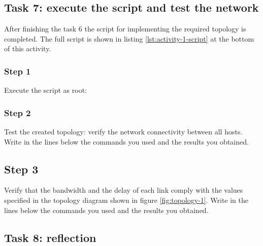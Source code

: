 


\subsection*{Task 7: execute the script and test the network}
After finishing the task 6 the script for implementing the required topology is
completed. The full script is shown in listing \ref{lst:activity-1-script} at the
bottom of this activity.

\subsubsection*{Step 1}
Execute the script as root: \\

\subsubsection*{Step 2}
Test the created topology: verify the network connectivity between all hosts.
Write in the lines below the commands you used and the results you obtained.

\hrulefill

\hrulefill

\hrulefill

\hrulefill

\subsection*{Step 3}
Verify that the bandwidth and the delay of each link comply with the values
specified in the topology diagram shown in figure \ref{fig:topology-1}.
Write in the lines below the commands you used and the results you obtained.

\hrulefill

\hrulefill

\hrulefill

\hrulefill




\subsection*{Task 8: reflection}
